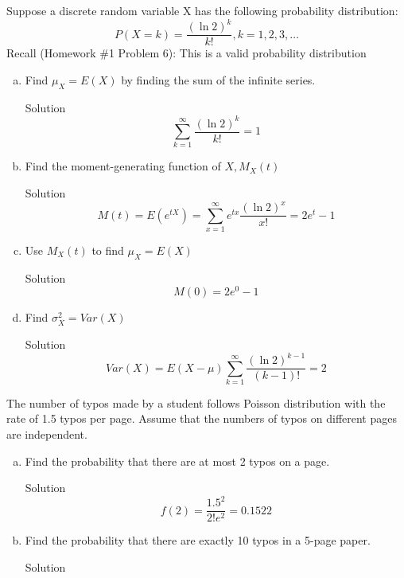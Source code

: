 \documentclass{article}
\begin{document}
\begin{spacing}{1.1}
\maketitle
\newpage
\begin{homeworkProblem}
	Suppose a discrete random variable X has the following probability distribution:
	\[P\left( {X = k} \right) = \frac{{{{\left( {\ln 2} \right)}^k}}}{{k!}},k = 1,2,3, \ldots \]
	Recall (Homework \#1 Problem 6): This is a valid probability distribution
	\begin{enumerate}[(a)]
		\item Find $\mu_X = E(X)$ by finding the sum of the infinite series.
			\begin{homeworkSection}{Solution}
				\[\sum\limits_{k = 1}^\infty  {\frac{{{{\left( {\ln 2} \right)}^k}}}{{k!}}}  = 1\]
			\end{homeworkSection}
		\item Find the moment-generating function of $X, M_X (t)$
			\begin{homeworkSection}{Solution}
				\[M\left( t \right) = E\left( {{e^{tX}}} \right) = \sum\limits_{x = 1}^\infty  {{e^{tx}}\frac{{{{\left( {\ln 2} \right)}^x}}}{{x!}}}  = 2{e^t} - 1\]
			\end{homeworkSection}
		\item Use $M_X (t)$ to find $\mu_X = E(X)$
			\begin{homeworkSection}{Solution}
				\[M(0) = 2{e^0} - 1\]
			\end{homeworkSection}
		\item Find $\sigma _X^2 = Var(X)$
			\begin{homeworkSection}{Solution}
				\[Var\left( X \right) = E\left( {X - \mu } \right)\sum\limits_{k = 1}^\infty  {\frac{{{{\left( {\ln 2} \right)}^{k - 1}}}}{{(k - 1)!}}}  = 2\]
			\end{homeworkSection}
	\end{enumerate}
\end{homeworkProblem}
\begin{homeworkProblem}
	The number of typos made by a student follows Poisson distribution with the rate of 1.5 typos per page. Assume that the numbers of typos on different pages are independent.
	\begin{enumerate}[(a)]
		\item Find the probability that there are at most 2 typos on a page.
			\begin{homeworkSection}{Solution}
				\[f\left( 2 \right) = \frac{{{{1.5}^2}}}{{2!{e^2}}} = 0.1522\]
			\end{homeworkSection}
		\item Find the probability that there are exactly 10 typos in a 5-page paper.
			\begin{homeworkSection}{Solution}
					

\end{homeworkSection}
\end{enumerate}
\end{homeworkProblem}
\end{spacing}
\end{document}
